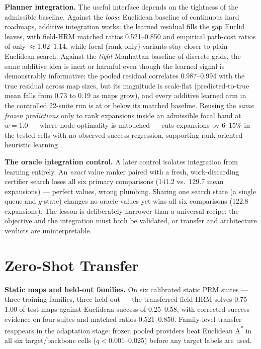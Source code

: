 \documentclass[11pt,letterpaper]{article}
\begin{document}
\textbf{Planner integration.} The useful interface depends on the tightness of the admissible baseline. Against the \emph{loose} Euclidean baseline of continuous hard roadmaps, additive integration works: the learned residual fills the gap Euclid leaves, with field-HRM matched ratios 0.521--0.850 and empirical path-cost ratios of only ${\approx}1.02$--1.14, while focal (rank-only) variants stay closer to plain Euclidean search. Against the \emph{tight} Manhattan baseline of discrete grids, the same additive idea is inert or harmful even though the learned signal is demonstrably informative: the pooled residual correlates 0.987--0.994 with the true residual across map sizes, but its magnitude is scale-flat (predicted-to-true mean falls from 0.73 to 0.19 as maps grow), and every additive learned arm in the controlled 22-suite run is at or below its matched baseline. Reusing the \emph{same frozen predictions} only to rank expansions inside an admissible focal band at $w{=}1.0$ --- where node optimality is untouched --- cuts expansions by 6--15\% in the tested cells with no observed success regression, supporting rank-oriented heuristic learning \citep{chrestien2023rank}.

\textbf{The oracle integration control.} A later control isolates integration from learning entirely. An \emph{exact} value ranker paired with a fresh, work-discarding certifier search loses all six primary comparisons (141.2 vs.\ 129.7 mean expansions) --- perfect values, wrong plumbing. Sharing one search state (a single queue and $g$-state) changes no oracle values yet wins all six comparisons (122.8 expansions). The lesson is deliberately narrower than a universal recipe: the objective and the integration must both be validated, or transfer and architecture verdicts are uninterpretable.

\section{Zero-Shot Transfer}

\textbf{Static maps and held-out families.} On six calibrated static PRM suites --- three training families, three held out --- the transferred field HRM solves 0.75--1.00 of test maps against Euclidean success of 0.25--0.58, with corrected success evidence on four suites and matched ratios 0.521--0.850. Family-level transfer reappears in the adaptation stage: frozen pooled providers beat Euclidean A\textsuperscript{*} in all six target/backbone cells ($q{<}0.001$--0.025) before any target labels are used.
\end{document}
